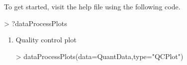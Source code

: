 \documentclass[11pt]{article}
\begin{document}
\begin{enumerate}
To get started, visit the help file using the following code.
\begin{small}
\begin{Schunk}
\begin{Sinput}
> ?dataProcessPlots
\end{Sinput}
\end{Schunk}
\end{small}

\vspace{-0.3cm}
\begin{enumerate}
\item{Quality control plot }

\vspace{-0.1cm}
\begin{small}
\begin{Schunk}
\begin{Sinput}
> dataProcessPlots(data=QuantData,type="QCPlot")
\end{Sinput}
\end{Schunk}
\end{small}


\end{enumerate}
\end{enumerate}
\end{document}
